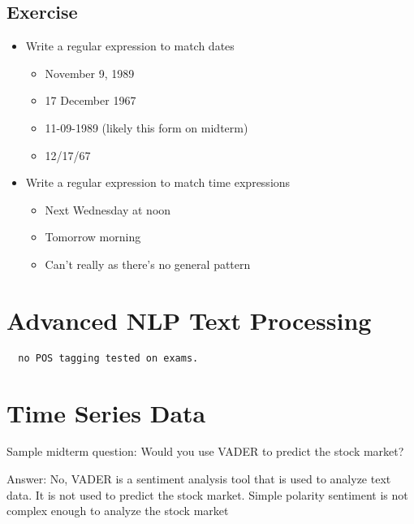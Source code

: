 \documentclass[11pt]{article}
\theoremstyle{definition}
\begin{document}
\subsection{Exercise}
\begin{itemize}
  \item Write a regular expression to match dates
  \begin{itemize}
    \item November 9, 1989
    \item 17 December 1967
    \item 11-09-1989 (likely this form on midterm)
    \item 12/17/67
  \end{itemize}
  \item Write a regular expression to match time expressions
  \begin{itemize}
    \item Next Wednesday at noon
    \item Tomorrow morning
    \item Can't really as there's no general pattern
  \end{itemize}
\end{itemize}

\section{Advanced NLP Text Processing}
\begin{verbatim}
  no POS tagging tested on exams.
\end{verbatim}

\section{Time Series Data}

Sample midterm question: Would you use VADER to predict the stock market?

Answer: No, VADER is a sentiment analysis tool that is used to analyze text data. It is not used to predict the stock market.
Simple polarity sentiment is not complex enough to analyze the stock market
\end{document}
